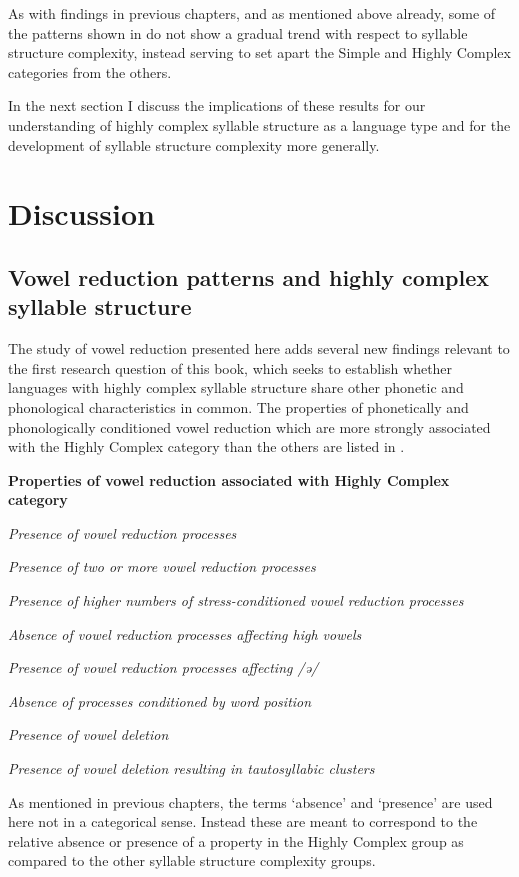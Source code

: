   As with findings in previous chapters, and as mentioned above already, some of the patterns shown in  do not show a gradual trend with respect to syllable structure complexity, instead serving to set apart the Simple and Highly Complex categories from the others.

  In the next section I discuss the implications of these results for our understanding of highly complex syllable structure as a language type and for the development of syllable structure complexity more generally.

\section{Discussion}\label{sec:6.4}
\subsection{Vowel reduction patterns and highly complex syllable structure}\label{sec:6.4.1}

  The study of vowel reduction presented here adds several new findings relevant to the first research question of this book, which seeks to establish whether languages with highly complex syllable structure share other phonetic and phonological characteristics in common. The properties of phonetically and phonologically conditioned vowel reduction which are more strongly associated with the Highly Complex category than the others are listed in .

\ea\label{ex:6.20}
  \textbf{Properties of vowel reduction associated with Highly Complex category}

\textit{Presence of vowel reduction processes}

\textit{Presence of two or more vowel reduction processes}

\textit{Presence of higher numbers of stress-conditioned vowel reduction processes}

\textit{Absence of vowel reduction processes affecting high vowels}

\textit{Presence of vowel reduction processes affecting /ə/}

\textit{Absence of processes conditioned by word position}

\textit{Presence of vowel deletion}

\textit{Presence of vowel deletion resulting in tautosyllabic clusters}
\z

  As mentioned in previous chapters, the terms ‘absence’ and ‘presence’ are used here not in a categorical sense. Instead these are meant to correspond to the relative absence or presence of a property in the Highly Complex group as compared to the other syllable structure complexity groups.

